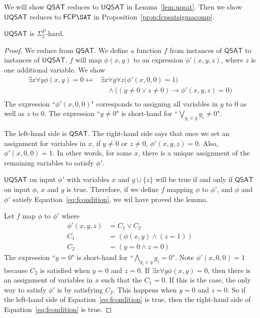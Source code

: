 \documentclass[runningheads,a4paper]{llncs}
\newcommand{\QSAT}{\mathsf{QSAT}}
\newcommand{\UQSAT}{\mathsf{UQSAT}}
\begin{document}
We will show $\QSAT$ reduces to $\UQSAT$ in Lemma~\ref{lem:uqsat}. Then we show $\UQSAT$ reduces to $\mathsf{FCP} \SAT$ in Proposition~\ref{prop:fcpsatsigmacomp}. 

\begin{lemma}
\label{lem:uqsat}
$\UQSAT$ is $\Sigma_2^P$-hard.
\end{lemma}

\begin{proof}
We reduce from $\QSAT$. We define a function $f$ from instances of $\QSAT$ to instances of $\UQSAT$. $f$ will map $\phi(x,y)$ to an expression $\phi'(x, y, z)$, where $z$ is one additional variable. We show
\begin{equation}
\label{eq:fcondition}
\begin{split}
\exists x \forall y \phi(x,y) = 0 \leftrightarrow & \exists x \forall y\forall z \big(\phi'(x, 0, 0) = 1 \big)\\
 &\quad \wedge \big((y \neq 0 \vee z \neq 0 ) \rightarrow \phi'(x, y, z) = 0 \big) \\
\end{split}
\end{equation}
The expression ``$\phi'(x, 0, 0)$" corresponds to assigning all variables in $y$ to $0$ as well as $z$ to 0. The expression ``$y \neq 0$" is short-hand for ``$\bigvee_{y_i \in y} y_i \neq 0$". 

The left-hand side is $\QSAT$. The right-hand side says that once we set an assignment for variables in $x$, if $y\neq 0$ or $z\neq 0$, $\phi'(x,y,z) = 0$. Also, $\phi'(x, 0, 0) = 1$. In other words, for some $x$, there is a unique assignment of the remaining variables to satisfy $\phi'$. 

$\UQSAT$ on input $\phi'$ with variables $x$ and $y \cup \{z\}$ will be true if and only if $\QSAT$ on input $\phi$, $x$ and $y$ is true. Therefore, if we define $f$ mapping $\phi$ to $\phi'$, and $\phi$ and $\phi'$ satisfy Equation~\ref{eq:fcondition}, we wil have proved the lemma.

Let $f$ map $\phi$ to $\phi'$ where
\begin{align}
\phi'(x, y, z) &= C_1 \vee C_2 \\
		    C_1 &=\left(\phi(x, y) \wedge (z = 1)\right) \\
		   C_2 &=  \left( y = 0 \wedge z = 0 \right) 
\end{align}
The expression ``$y = 0$" is short-hand for ``$\bigwedge_{y_i \in y} y_i = 0$". Note $\phi'(x, 0, 0) = 1$ because $C_2$ is satisfied when $y=0$ and $z = 0$. If $\exists x \forall y \phi(x, y)= 0$, then there is an assignment of variables in $x$ such that the $C_1 = 0$. If this is the case, the only way to satisfy $\phi'$ is by satisfying $C_2$. This happens when $y = 0$ and $z = 0$. So if the left-hand side of Equation~\ref{eq:fcondition} is true, then the right-hand side of Equation~\ref{eq:fcondition} is true.


\end{proof}
\end{document}
